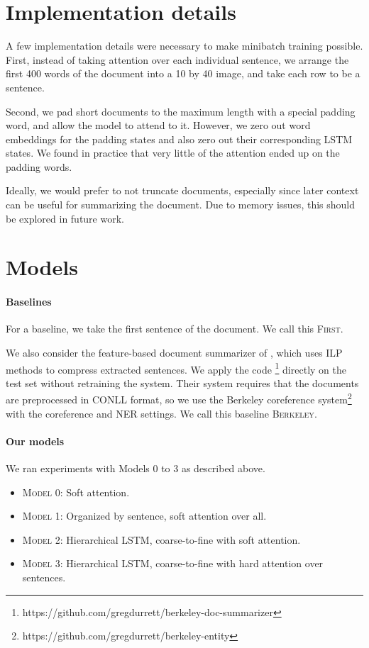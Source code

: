 \documentclass[12pt]{report}
\begin{document}
\section{Implementation details}

A few implementation details were necessary to make minibatch training possible. First, instead of taking attention over each individual sentence, we arrange the first 400 words of the document into a 10 by 40 image, and take each row to be a sentence.

Second, we pad short documents to the maximum length with a special padding word, and allow the model to attend to it. However, we zero out word embeddings for the padding states and also zero out their corresponding LSTM states. We found in practice that very little of the attention ended up on the padding words.

Ideally, we would prefer to not truncate documents, especially since later context can be useful for summarizing the document. Due to memory issues, this should be explored in future work.

\section{Models}

\paragraph{Baselines}
For a baseline, we take the first sentence of the document. We call this \textsc{First}.

We also consider the feature-based document summarizer of \citet{Durrett2016}, which uses ILP methods to compress extracted sentences. We apply the code \footnote{https://github.com/gregdurrett/berkeley-doc-summarizer} directly on the test set without retraining the system. Their system requires that the documents are preprocessed in CONLL format, so we use the Berkeley coreference system\footnote{https://github.com/gregdurrett/berkeley-entity} with the coreference and NER settings. We call this baseline \textsc{Berkeley}.

\paragraph{Our models}

We ran experiments with Models 0 to 3 as described above.

\begin{itemize}
\item \textsc{Model 0}: Soft attention.
\item \textsc{Model 1}: Organized by sentence, soft attention over all.
\item \textsc{Model 2}: Hierarchical LSTM, coarse-to-fine with soft attention.
\item \textsc{Model 3}: Hierarchical LSTM, coarse-to-fine with hard attention over sentences.
\end{itemize}
\end{document}
